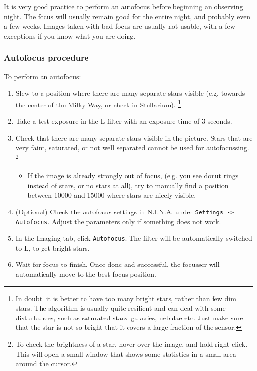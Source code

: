 \documentclass[a4paper, 11pt, fleqn]{memoir}
\begin{document}
It is very good practice to perform an autofocus before beginning an observing night.
The focus will usually remain good for the entire night, and probably even a few weeks.
Images taken with bad focus are usually not usable, with a few exceptions if you know what you are doing.

\subsubsection*{Autofocus procedure}
To perform an autofocus:

\begin{enumerate}
    \item Slew to a position where there are many separate stars visible (e.g. towards the center of the Milky Way, or check in Stellarium).
          \footnote{In doubt, it is better to have too many bright stars, rather than few
              dim stars.
              The algorithm is usually quite resilient and can deal with some disturbances, such as saturated stars, galaxies, nebulae etc. Just make sure that the star is not so bright that it covers a large fraction of the sensor.
          }
    \item
          Take a test exposure in the L filter with an exposure time of 3 seconds.
    \item
          Check that there are many separate stars visible in the picture.
          Stars that are very faint, saturated, or not well separated cannot be used for autofocussing.
          \footnote{To check the brightness of a star, hover over the image, and hold right click.
              This will open a small window that shows some statistics in a small area around the cursor.
          }
          \begin{itemize}
              \item
                    If the image is already strongly out of focus, (e.g. you see donut rings instead of stars, or no stars at all), try to manually find a position between 10000 and 15000 where stars are nicely visible.
          \end{itemize}
    \item
          (Optional) Check the autofocus settings in N.I.N.A. under \texttt{Settings -> Autofocus}.
          Adjust the parameters only if something does not work.
    \item
          In the Imaging tab, click \texttt{Autofocus}.
          The filter will be automatically switched to L, to get bright stars.
    \item
          Wait for focus to finish.
          Once done and successful, the focusser will automatically move to the best focus position.
\end{enumerate}
\end{document}
